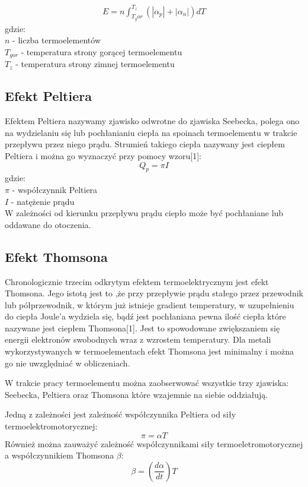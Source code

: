 \documentclass[oneside]{mgr}
\begin{document}
\begin{eqnarray}
    E = n \int_{T_gor}^{T_z}(|\alpha_p|+|\alpha_n|)dT
\end{eqnarray}
gdzie: \\
$n$ - liczba termoelementów \\
$T_{gor}$ - temperatura strony gorącej termoelementu \\
$T_z$ - temperatura strony zimnej termoelementu
\subsection{Efekt Peltiera}
Efektem Peltiera nazywamy zjawisko odwrotne do zjawiska Seebecka, polega ono na wydzielaniu się lub pochłanianiu ciepła na spoinach termoelementu w trakcie przepływu przez niego prądu. Strumień takiego ciepła nazywany jest ciepłem Peltiera i można go wyznaczyć przy pomocy wzoru[1]:
\begin{equation}
    Q_p = \pi I
\end{equation}
gdzie: \\
$\pi$ - współczynnik Peltiera \\
$I$ - natężenie prądu \\

W zależności od kierunku przepływu prądu ciepło może być pochłaniane lub oddawane do otoczenia.
\subsection{Efekt Thomsona}
Chronologicznie trzecim odkrytym efektem termoelektrycznym jest efekt Thomsona. Jego istotą jest to ,że przy przepływie prądu stałego przez przewodnik lub półprzewodnik, w którym już istnieje gradient temperatury, w uzupełnieniu do ciepła Joule'a wydziela się, bądź jest pochłaniana pewna ilość ciepła które nazywane jest ciepłem Thomsona[1]. Jest to spowodowane zwiększaniem się energii elektronów swobodnych wraz z wzrostem temperatury. Dla metali wykorzystywanych w termoelementach efekt Thomsona jest minimalny i można go nie uwzględniać w obliczeniach.

W trakcie pracy termoelementu można zaobserwować wszystkie trzy zjawiska: Seebecka, Peltiera oraz Thomsona które wzajemnie na siebie oddziałują.

Jedną z zależności jest zależność współczynnika Peltiera od siły termoelektromotorycznej:
\begin{equation}
    \pi = \alpha T
\end{equation}
Również można zauważyć zależność współczynnikami siły termoeletromotorycznej a współczynnikiem Thomsona $\beta$:
\begin{equation}
    \beta = (\frac{d\alpha}{dt})T
\end{equation}
\end{document}
